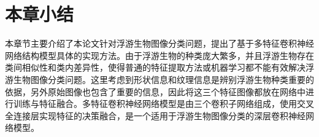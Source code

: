 
\section{本章小结}
本章节主要介绍了本论文针对浮游生物图像分类问题，提出了基于多特征卷积神经网络结构模型具体的实现方法。由于浮游生物的种类庞大繁多，并且浮游生物存在类间相似性和类内差异性，使得普通的特征提取方法或机器学习都不能有效解决浮游生物图像分类问题。这里考虑到形状信息和纹理信息是辨别浮游生物种类重要的依据，另外原始图像也包含了重要的信息，因此将这三个特征图像都放在网络中进行训练与特征融合。多特征卷积神经网络模型是由三个卷积子网络组成，使用交叉全连接层实现特征的决策融合，是一个适用于浮游生物图像分类的深层卷积神经网络模型。









